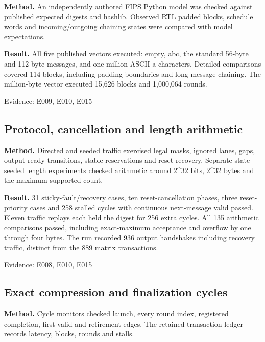 \documentclass[11pt,a4paper]{article}
\begin{document}
\textbf{Method.} An independently authored FIPS Python model was checked against published expected digests and hashlib. Observed RTL padded blocks,\allowbreak{} schedule words and incoming/\allowbreak{}outgoing chaining states were compared with model expectations.

\textbf{Result.} All five published vectors executed: empty,\allowbreak{} abc,\allowbreak{} the standard 56-byte and 112-byte messages,\allowbreak{} and one million ASCII a characters. Detailed comparisons covered 114 blocks,\allowbreak{} including padding boundaries and long-message chaining. The million-byte vector executed 15,\allowbreak{}626 blocks and 1,\allowbreak{}000,\allowbreak{}064 rounds.

{\small Evidence: E009,\allowbreak{} E010,\allowbreak{} E015}

\subsection{Protocol,\allowbreak{} cancellation and length arithmetic}

\textbf{Method.} Directed and seeded traffic exercised legal masks,\allowbreak{} ignored lanes,\allowbreak{} gaps,\allowbreak{} output-ready transitions,\allowbreak{} stable reservations and reset recovery. Separate state-seeded length experiments checked arithmetic around 2\textasciicircum{}32 bits,\allowbreak{} 2\textasciicircum{}32 bytes and the maximum supported count.

\textbf{Result.} 31 sticky-fault/\allowbreak{}recovery cases,\allowbreak{} ten reset-cancellation phases,\allowbreak{} three reset-priority cases and 258 stalled cycles with continuous next-message valid passed. Eleven traffic replays each held the digest for 256 extra cycles. All 135 arithmetic comparisons passed,\allowbreak{} including exact-maximum acceptance and overflow by one through four bytes. The run recorded 936 output handshakes including recovery traffic,\allowbreak{} distinct from the 889 matrix transactions.

{\small Evidence: E008,\allowbreak{} E010,\allowbreak{} E015}

\subsection{Exact compression and finalization cycles}

\textbf{Method.} Cycle monitors checked launch,\allowbreak{} every round index,\allowbreak{} registered completion,\allowbreak{} first-valid and retirement edges. The retained transaction ledger records latency,\allowbreak{} blocks,\allowbreak{} rounds and stalls.
\end{document}
